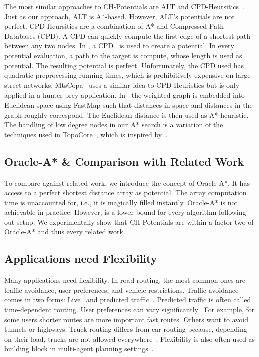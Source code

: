 \documentclass[letterpaper]{article} %
\begin{document}
The most similar approaches to CH-Potentials are ALT and CPD-Heursitics~\cite{DBLP:conf/ijcai/BonoGHS19}.
Just as our approach, ALT is A*-based.
However, ALT's potentials are not perfect. 
%
CPD-Heursitics are a combination of A* and Compressed Path Databases (CPD). 
A CPD can quickly compute the first edge of a shortest path between any two nodes.
In \cite{DBLP:conf/ijcai/BonoGHS19}, a CPD~\cite{DBLP:conf/socs/StrasserHB14} is used to create a potential.
In every potential evaluation, a path to the target is compute, whose length is used as potential.
The resulting potential is perfect.
Unfortunately, the CPD used has quadratic preprocessing running times, which is prohibitively expensive on large street networks.
%
MtsCopa~\cite{DBLP:journals/tciaig/BaierBHH15} uses a similar idea to CPD-Heuristics but is only applied in a hunter-prey application.
%
In~\cite{DBLP:conf/ijcai/0002UJAKK18} the weighted graph is embedded into Euclidean space using FastMap such that distances in space and distances in the graph roughly correspond.
The Euclidean distance is then used as A* heuristic.
%
The handling of low degree nodes in our A* search is a variation of the techniques used in TopoCore~\cite{DBLP:conf/gis/DibbeltSW15}, which is inspired by~\cite{DBLP:journals/pvldb/FunkeNS14}.

\subsection{Oracle-A* \& Comparison with Related Work}

To compare against related work, we introduce the concept of Oracle-A*.
It has access to a perfect shortest distance array as potential.
The array computation time is unaccounted for, i.e., it is magically filled instantly.
Oracle-A* is not achievable in practice.
However, is a lower bound for every algorithm following out setup.
We experimentally show that CH-Potentials are within a factor two of Oracle-A* and thus every related work.

\subsection{Applications need Flexibility}

Many applications need flexibility.
In road routing, the most common ones are traffic avoidance, user preferences, and vehicle restrictions.
Traffic avoidance comes in two forms: Live~\cite{CRP,CCH} and predicted traffic~\cite{td-alt,td-ch}.
Predicted traffic is often called time-dependent routing.
%
User preferences can vary significantly~\cite{DBLP:conf/gis/FunkeS15,DBLP:conf/gis/DellingGGKTW15,DBLP:conf/gis/FunkeLS16}
For example, for some users shorter routes are more important fast routes.
Others want to avoid tunnels or highways.
%
Truck routing differs from car routing because, depending on their load, trucks are not allowed everywhere~\cite{kswz-erptd-20}.
%
Flexibility is also often used as building block in multi-agent planning settings~\cite{DBLP:journals/ai/SharonSFS15,DBLP:journals/tciaig/BaierBHH15}.
\end{document}

